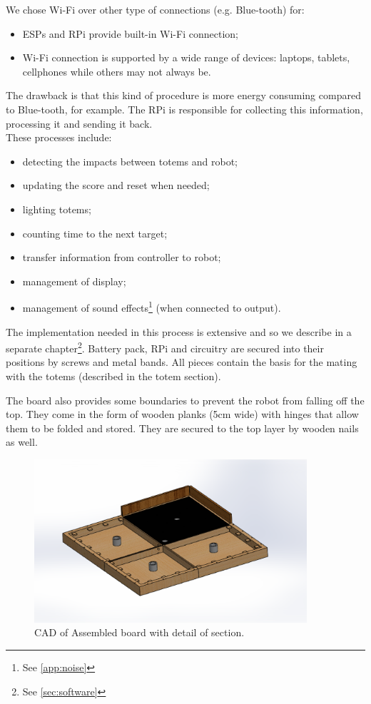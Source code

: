 \documentclass[a4paper,twoside]{book}
\begin{document}
We chose Wi-Fi over other type of connections (e.g. Blue-tooth) for:
\begin{itemize}
\item ESPs and RPi provide built-in Wi-Fi connection;
\item Wi-Fi connection is supported by a wide range of devices: laptops, tablets, cellphones \textellipsis while others may not always be. 
\end{itemize}
The drawback is that this kind of procedure is more energy consuming compared to Blue-tooth, for example.
The RPi is responsible for collecting this information, processing it and sending it back.
\\
These processes include:
\begin{itemize}
\item detecting the impacts between totems and robot;
\item updating the score and reset when needed;
\item lighting totems;
\item counting time to the next target;
\item transfer information from controller to robot;
\item management of display;
\item management of sound effects\footnote {See \autoref{app:noise}} (when connected to output).

\end{itemize}
The implementation needed in this process is extensive and so we describe in a separate chapter\footnote{ See \autoref{sec:software}}.
Battery pack, RPi and circuitry are secured into their positions by screws and metal bands. All pieces contain the basis for the mating with the totems (described in the totem section).

The board also provides some boundaries to prevent the robot from falling off the top. They come in the form of wooden planks (5cm wide) with hinges that allow them to be folded and stored. They are secured to the top layer by wooden nails as well.

\begin{figure}[h]
\centering
\includegraphics[width=0.9\textwidth]{img/Board.eps}
\caption{CAD of Assembled board with detail of section.}
\end{figure}
\end{document}
